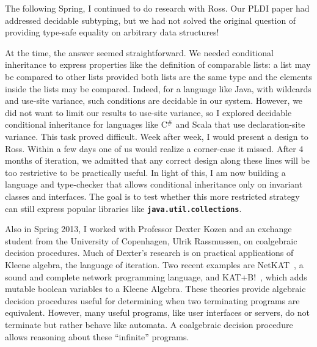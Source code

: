 \documentclass[12pt]{article}
\newcommand{\mono}[1]{\textbf{\texttt{#1}}}
\newcommand{\hdr}[2]{\vspace{-0.4cm}{\flushleft{\hrulefill\\\textbf{#1}\hfill{#2}\\\vspace{-0.2cm}\hrulefill}}\vspace{0.1cm}}
\begin{document}
The following Spring, I continued to do research with Ross.
Our PLDI paper had addressed decidable subtyping, but we had not solved the original question of providing type-safe equality on arbitrary data structures!

At the time, the answer seemed straightforward.
We needed conditional inheritance to express properties like the definition of comparable lists: a list may be compared to other lists provided both lists are the same type and the elements inside the lists may be compared.
Indeed, for a language like Java, with wildcards and use-site variance, such conditions are decidable in our system.
However, we did not want to limit our results to use-site variance, so I explored decidable conditional inheritance for languages like C$^{\#}$ and Scala that use declaration-site variance.
This task proved difficult.
Week after week, I would present a design to Ross.
Within a few days one of us would realize a corner-case it missed.
After 4 months of iteration, we admitted that any correct design along these lines will be too restrictive to be practically useful.
In light of this, I am now building a language and type-checker that allows conditional inheritance only on invariant classes and interfaces.
The goal is to test whether this more restricted strategy can still express popular libraries like \mono{java.util.collections}.


\hdr{Kleene Coalgebras}{Spring 2014}

Also in Spring 2013, I worked with Professor Dexter Kozen and an exchange student from the University of Copenhagen, Ulrik Rassmussen, on coalgebraic decision procedures.
Much of Dexter's research is on practical applications of Kleene algebra, the language of iteration.
Two recent examples are NetKAT~\cite{anderson2014netkat}, a sound and complete network programming language, and KAT+B!~\cite{GKM14a}, which adds mutable boolean variables to a Kleene Algebra.
These theories provide algebraic decision procedures useful for determining when two terminating programs are equivalent.
However, many useful programs, like user interfaces or servers, do not terminate but rather behave like automata.
A coalgebraic decision procedure allows reasoning about these ``infinite'' programs.
\end{document}
